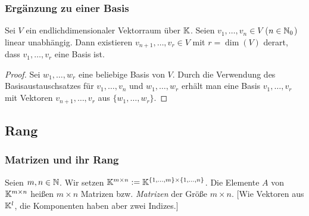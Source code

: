 \subsubsection{Ergänzung zu einer Basis}

\begin{thm}[Basisergänzungssatz]
	Sei $ V $ ein endlichdimensionaler Vektorraum über $ \mathbb K $. Seien $ v_1, \ldots, v_n \in V $ ($ n \in \mathbb N_0 $) linear unabhängig. Dann existieren $ v_{n+1}, \ldots, v_r \in V $ mit $ r = \dim(V) $ derart, dass $ v_1, \ldots, v_r $ eine Basis ist.
\end{thm}
\begin{proof}
	Sei $ w_1, \ldots, w_r $ eine beliebige Basis von $ V $. Durch die Verwendung des Basisaustauschsatzes für $ v_1, \ldots, v_n $ und $ w_1, \ldots, w_r $ erhält man eine Basis $ v_1, \ldots, v_r $ mit Vektoren $ v_{n+1}, \ldots, v_r $ aus $ \{ w_1, \ldots, w_r \} $.
\end{proof}

\subsection{Rang}

\subsubsection{Matrizen und ihr Rang}

Seien $ m,n \in \mathbb N $. Wir setzen $ \mathbb K^{m \times n} := \mathbb K^{ \{ 1, \ldots, m \} \times \{ 1, \ldots, n \} } $. Die Elemente $ A $ von $ \mathbb K^{m \times n} $ heißen $ m \times n $ Matrizen bzw. \emph{Matrizen} der Größe $ m \times n $. [Wie Vektoren aus $ \mathbb K^l $, die Komponenten haben aber zwei Indizes.]

